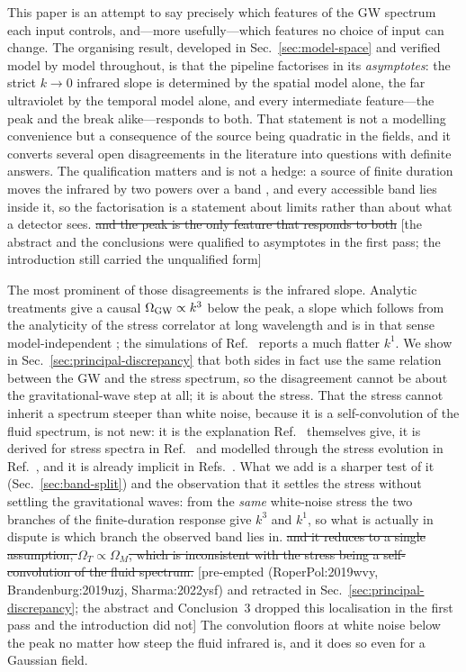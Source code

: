 \documentclass[10pt,prd,aps,nobibnotes,superscriptaddress,preprintnumbers,notitlepage]{revtex4-1}
\newcommand{\add}[1]{{\color{red}#1}}
\newcommand{\del}[1]{{\color{red}\sout{#1}}}
\newcommand{\why}[1]{{\color{red}\footnotesize\textsf{[#1]}}}
\newcommand{\add}[1]{#1}
\newcommand{\del}[1]{}
\newcommand{\why}[1]{}
\begin{document}
This paper is an attempt to say precisely which features of the GW spectrum each
input controls, and---more usefully---which features no choice of input can
change. The organising result, developed in Sec.~\ref{sec:model-space} and
verified model by model throughout, is that the pipeline factorises \add{in its
\emph{asymptotes}}: the \add{strict $k\to0$} infrared
slope is determined by the spatial model alone, the \add{far} ultraviolet by the
temporal model alone, and \add{every intermediate feature---the peak and the break
alike---responds to both}. That
statement is not a modelling convenience but a consequence of the source being
quadratic in the fields, and it converts several open disagreements in the
literature into questions with definite answers. \add{The qualification matters and
is not a hedge: a source of finite duration moves the infrared by two powers over a
band \cite{Caprini:2009fx,RoperPol:2022iel,RoperPol:2023dzg}, and every accessible
band lies inside it, so the factorisation is a statement about limits rather than
about what a detector sees.}
\del{and the peak is the only feature that responds to both}
\why{the abstract and the conclusions were qualified to asymptotes in the first
pass; the introduction still carried the unqualified form}

The most prominent of those disagreements is the infrared slope. Analytic
treatments give a causal $\Omega_{\rm GW}\propto k^{3}$ below the peak, a slope
which follows from the analyticity of the stress correlator at long wavelength and
is in that sense model-independent
\cite{Caprini:2006jb,Caprini:2018mtu,Cai:2019cdl}; the simulations of
Ref.~\cite{RoperPol:2019wvy} reports a much flatter $k^{1}$. We show in
Sec.~\ref{sec:principal-discrepancy} that both sides in fact use the same relation
between the GW and the stress spectrum, so the disagreement cannot be about the
gravitational-wave step at all; it is about the stress.
\add{That the stress cannot inherit a spectrum steeper than white noise, because it
is a self-convolution of the fluid spectrum, is not new: it is the explanation
Ref.~\cite{RoperPol:2019wvy} themselves give, it is derived for stress spectra in
Ref.~\cite{Brandenburg:2019uzj} and modelled through the stress evolution in
Ref.~\cite{Sharma:2022ysf}, and it is already implicit in
Refs.~\cite{Caprini:2006jb,Caprini:2009fx}. What we add is a sharper test of it
(Sec.~\ref{sec:band-split}) and the observation that it settles the stress without
settling the gravitational waves: from the \emph{same} white-noise stress the two
branches of the finite-duration response give $k^{3}$ and $k^{1}$, so what is
actually in dispute is which branch the observed band lies in.}
\del{and it reduces to a single
assumption, $\Omega_{T}\propto\Omega_{M}$, which is inconsistent with the stress
being a self-convolution of the fluid spectrum.}
\why{pre-empted (RoperPol:2019wvy, Brandenburg:2019uzj, Sharma:2022ysf) and
retracted in Sec.~\ref{sec:principal-discrepancy}; the abstract and Conclusion~3
dropped this localisation in the first pass and the introduction did not}
The convolution floors at white
noise below the peak no matter how steep the fluid infrared is, and it does so
even for a Gaussian field.
\end{document}
